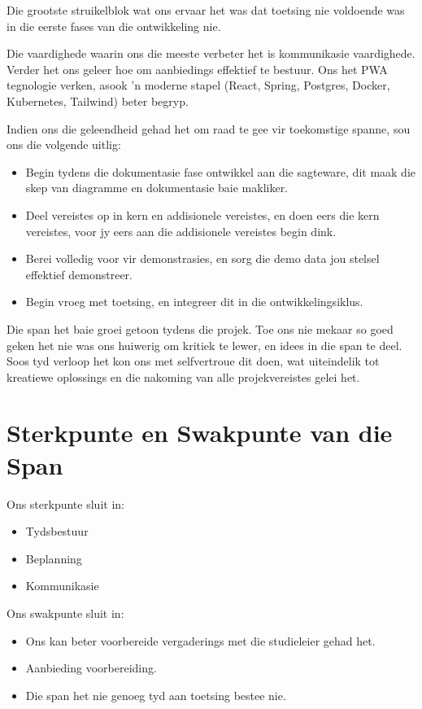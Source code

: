 Die grootste struikelblok wat ons ervaar het was dat toetsing nie voldoende was
in die eerste fases van die ontwikkeling nie.

Die vaardighede waarin ons die meeste verbeter het is kommunikasie vaardighede.
Verder het ons geleer hoe om aanbiedings effektief te bestuur. Ons het PWA
tegnologie verken, asook 'n moderne stapel (React, Spring, Postgres, Docker,
Kubernetes, Tailwind) beter begryp.

Indien ons die geleendheid gehad het om raad te gee vir toekomstige spanne, sou
ons die volgende uitlig:
\begin{itemize}
\item Begin tydens die dokumentasie fase ontwikkel aan die sagteware, dit maak
die skep van diagramme en dokumentasie baie makliker.
\item Deel vereistes op in kern en addisionele vereistes, en doen eers die kern
vereistes, voor jy eers aan die addisionele vereistes begin dink. 
\item Berei volledig voor vir demonstrasies, en sorg die demo data jou stelsel
effektief demonstreer.
\item Begin vroeg met toetsing, en integreer dit in die ontwikkelingsiklus.
\end{itemize}

Die span het baie groei getoon tydens die projek. Toe ons nie mekaar so goed
geken het nie was ons huiwerig om kritiek te lewer, en idees in die span te
deel. Soos tyd verloop het kon ons met selfvertroue dit doen, wat uiteindelik
tot kreatiewe oplossings en die nakoming van alle projekvereistes gelei het.

\section{Sterkpunte en Swakpunte van die Span}

Ons sterkpunte sluit in:
\begin{itemize}
    \item Tydsbestuur
    \item Beplanning
    \item Kommunikasie
\end{itemize}

Ons swakpunte sluit in:
\begin{itemize}
    \item Ons kan beter voorbereide vergaderings met die studieleier gehad het.
    \item Aanbieding voorbereiding.
    \item Die span het nie genoeg tyd aan toetsing bestee nie.
\end{itemize}

